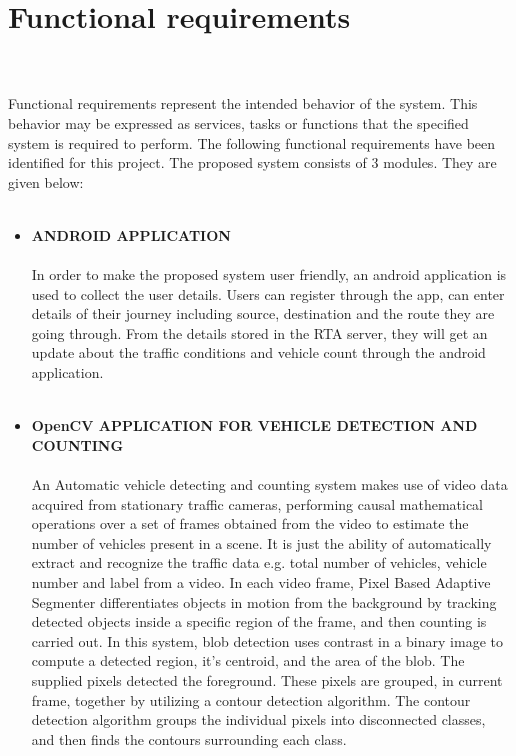 \section{Functional requirements}  \\
\\
Functional requirements represent the intended behavior of the system. This behavior may be expressed as services, tasks or functions that the specified system is required to perform. The following functional requirements have been identified for this project.
The proposed system consists of 3 modules. They are given below: \\ \\
\begin{itemize}
\item \textbf{ANDROID APPLICATION}\\ \\
In order to make the proposed system user friendly, an android application is used to collect the user details. Users can register through the app, can enter details of their journey including source, destination and the route they are going through. From the details stored in the RTA server, they will get an update about the traffic conditions and vehicle count through the android application. \\ \\
\item \textbf{OpenCV APPLICATION FOR VEHICLE DETECTION AND COUNTING}\\ \\
An Automatic vehicle detecting and counting system makes use of video data acquired from stationary traffic cameras, performing causal mathematical operations over a set of frames obtained from the video to estimate the number of vehicles present in a scene. It is just the ability of automatically extract and recognize the traffic data e.g. total number of vehicles, vehicle number and label from a video. In each video frame, Pixel Based Adaptive Segmenter differentiates objects in motion from the background by tracking detected objects inside a specific region of the frame, and then counting is carried out. In this system, blob detection uses contrast in a binary image to compute a detected region, it’s centroid, and the area of the blob. The supplied pixels detected the foreground. These pixels are grouped, in current frame, together by utilizing a contour detection algorithm. The contour detection algorithm groups the individual pixels into disconnected classes, and then finds the contours surrounding each class. \\

\end{itemize}
